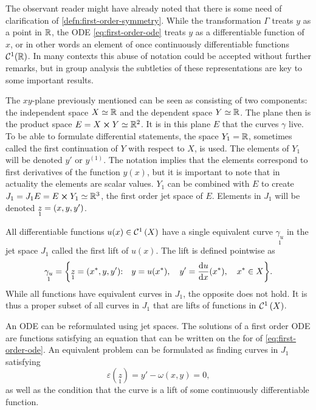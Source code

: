 The observant reader might have already noted that there is some need of clarification of \cref{defn:first-order-symmetry}.
While the transformation \(\Gamma\) treats \(y\) as a point in \(\mathbb{R}\), the ODE \ref{eq:first-order-ode} treats \(y\) as a differentiable function of \(x\), or in other words an element of once continuously differentiable functions \(\mathcal{C}^1(\mathbb{R})\).
In many contexts this abuse of notation could be accepted without further remarks, but in group analysis the subtleties of these representations are key to some important results.

The \(xy\)-plane previously mentioned can be seen as consisting of two components: the independent space \(X \simeq \mathbb{R}\) and the dependent space \(Y \simeq \mathbb{R}\).
The plane then is the product space \(E = X \cross Y \simeq \mathbb{R}^2\).
It is in this plane \(E\) that the curves \(\gamma\) live.
To be able to formulate differential statements, the space \(Y_1 = \mathbb{R}\), sometimes called the first continuation of \(Y\) with respect to \(X\), is used.
The elements of \(Y_1\) will be denoted \(y'\) or \(y^{(1)}\).
The notation implies that the elements correspond to first derivatives of the function \(y(x)\), but it is important to note that in actuality the elements are scalar values.
\(Y_1\) can be combined with \(E\) to create \(J_1 = J_1 E = E \cross Y_1 \simeq \mathbb{R}^3\), the first order jet space of \(E\).
Elements in \(J_1\) will be denoted \(\underset{1}{z} = \qty(x, y, y')\).

All differentiable functions \(u(x) \in \cont{1}{X}\) have a single equivalent curve \(\underset{1}{\gamma_u}\) in the jet space \(J_1\) called the first lift of \(u(x)\).
The lift is defined pointwise as
\begin{equation}
  \underset{1}{\gamma_u} = \qty{\underset{1}{z} = \qty(\fixed{x}, y, y')\qq*{:} y = u(\fixed{x})\qc y' = \dv{u}{x}{(\fixed{x})}\qc \fixed{x} \in X}.
\end{equation}
While all functions have equivalent curves in \(J_1\), the opposite does not hold.
It is thus a proper subset of all curves in \(J_1\) that are lifts of functions in \(\cont{1}{X}\).

An ODE can be reformulated using jet spaces.
The solutions of a first order ODE are functions satisfying an equation that can be written on the for of \cref{eq:first-order-ode}.
An equivalent problem can be formulated as finding curves in \(J_1\) satisfying
\begin{equation} \label{eq:first-order-jet-ode}
  \varepsilon(\underset{1}{z}) = y' - \omega(x,y) = 0,
\end{equation}
as well as the condition that the curve is a lift of some continuously differentiable function.

